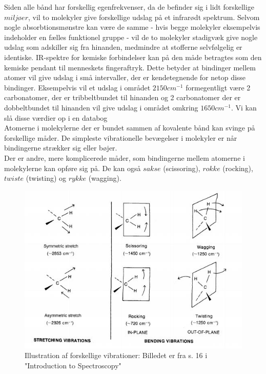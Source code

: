 Siden alle bånd har forskellig egenfrekvenser, da de befinder sig i lidt forskellige $miljøer$, vil to molekyler give forskellige udslag på et infrarødt spektrum. Selvom nogle absorbtionsmønstre kan være de samme - hvis begge molekyler eksempelvis indeholder en fælles funktionel gruppe - vil de to molekyler stadigvæk give nogle udslag som adskiller sig fra hinanden, medmindre at stofferne selvfølgelig er identiske. IR-spektre for kemiske forbindelser kan på den måde betragtes som den kemiske pendant til menneskets fingeraftryk. Dette betyder at bindinger mellem atomer vil give udslag i små intervaller, der er kendetegnende for netop disse bindinger. Eksempelvis vil et udslag i området $2150cm^{-1}$ formegentligt være 2 carbonatomer, der er tribbeltbundet til hinanden og 2 carbonatomer der er dobbeltbundet til hinanden vil give udslag i området omkring $1650cm^{-1}$. Vi kan slå disse værdier op i en databog
\\

Atomerne i molekylerne der er bundet sammen af kovalente bånd kan svinge på forskellige måder. De simpleste vibrationelle bevægelser i molekyler er når bindingerne strækker sig eller bøjer.
\\

Der er andre, mere komplicerede måder, som bindingerne mellem atomerne i molekylerne kan opføre sig på. De kan også $sakse$ (scissoring), $rokke$ (rocking), $twiste$ (twisting) og $rykke$ (wagging). 
\\

\begin{center}
\begin{figure}
\includegraphics[scale=1]{Billeder/streak}
\caption{Illustration af forskellige vibrationer: Billedet er fra s. 16 i "Introduction to Spectroscopy" \label{fig:spek}}
\end{figure}
\end{center}

